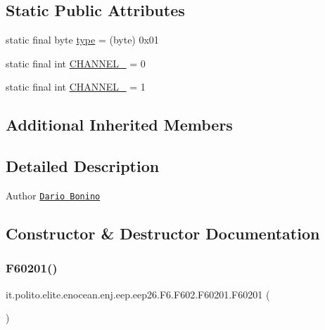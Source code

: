 \subsection*{Static Public Attributes}
\begin{DoxyCompactItemize}
\item 
static final byte \hyperlink{classit_1_1polito_1_1elite_1_1enocean_1_1enj_1_1eep_1_1eep26_1_1_f6_1_1_f602_1_1_f60201_afb9cb3e2a3a62c90ff7e75c3763512fa}{type} = (byte) 0x01
\item 
static final int \hyperlink{classit_1_1polito_1_1elite_1_1enocean_1_1enj_1_1eep_1_1eep26_1_1_f6_1_1_f602_1_1_f60201_a866f492d4b81d6fd397857c3ed7696bb}{C\+H\+A\+N\+N\+E\+L\+\_} = 0
\item 
static final int \hyperlink{classit_1_1polito_1_1elite_1_1enocean_1_1enj_1_1eep_1_1eep26_1_1_f6_1_1_f602_1_1_f60201_a15b7e3fefa1a9a94cc3e2a5d45b64e0e}{C\+H\+A\+N\+N\+E\+L\+\_} = 1
\end{DoxyCompactItemize}
\subsection*{Additional Inherited Members}


\subsection{Detailed Description}
\begin{DoxyAuthor}{Author}
\href{mailto:dario.bonino@gmail.com}{\tt Dario Bonino} 
\end{DoxyAuthor}


\subsection{Constructor \& Destructor Documentation}
\hypertarget{classit_1_1polito_1_1elite_1_1enocean_1_1enj_1_1eep_1_1eep26_1_1_f6_1_1_f602_1_1_f60201_aa67b360dda43c0ad97e115946d1d1988}{}\label{classit_1_1polito_1_1elite_1_1enocean_1_1enj_1_1eep_1_1eep26_1_1_f6_1_1_f602_1_1_f60201_aa67b360dda43c0ad97e115946d1d1988} 
\subsubsection{\texorpdfstring{F60201()}{F60201()}}
{\footnotesize\ttfamily it.\+polito.\+elite.\+enocean.\+enj.\+eep.\+eep26.\+F6.\+F602.\+F60201.\+F60201 (\begin{DoxyParamCaption}{ }\end{DoxyParamCaption})}



